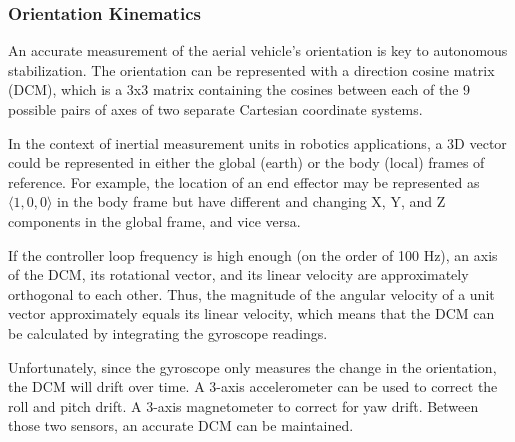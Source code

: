 \documentclass[12pt,letterpaper]{article}
\begin{document}
\subsubsection*{Orientation Kinematics}

An accurate measurement of the aerial vehicle's orientation is key to
autonomous stabilization. The orientation can be represented with a direction
cosine matrix (DCM), which is a 3x3 matrix containing the cosines between each
of the 9 possible pairs of axes of two separate Cartesian coordinate systems.

In the context of inertial measurement units in robotics applications, a 3D
vector could be represented in either the global (earth) or the body (local)
frames of reference. For example, the location of an end effector may be
represented as $\langle1, 0, 0\rangle$ in the body frame but have different and
changing X, Y, and Z components in the global frame, and vice versa.

If the controller loop frequency is high enough (on the order of 100 Hz), an
axis of the DCM, its rotational vector, and its linear velocity are
approximately orthogonal to each other. Thus, the magnitude of the angular
velocity of a unit vector approximately equals its linear velocity, which means
that the DCM can be calculated by integrating the gyroscope readings.

Unfortunately, since the gyroscope only measures the change in the orientation,
the DCM will drift over time. A 3-axis accelerometer can be used to correct the
roll and pitch drift. A 3-axis magnetometer to correct for yaw drift. Between
those two sensors, an accurate DCM can be maintained.



\end{document}
